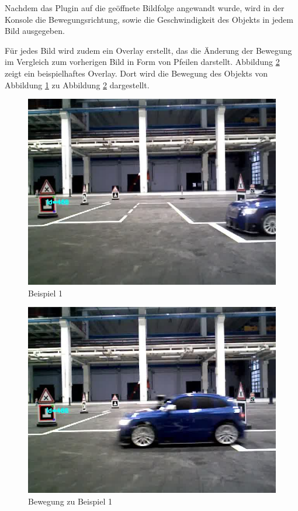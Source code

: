 Nachdem das Plugin auf die geöffnete Bildfolge angewandt wurde, wird in der Konsole die Bewegungsrichtung, sowie die Geschwindigkeit des Objekts in jedem Bild ausgegeben.

Für jedes Bild wird zudem ein Overlay erstellt, das die Änderung der Bewegung im Vergleich zum vorherigen Bild in Form von Pfeilen darstellt. Abbildung \ref{img:bsp2} zeigt ein beispielhaftes Overlay. Dort wird die Bewegung des Objekts von Abbildung \ref{img:bsp1} zu Abbildung \ref{img:bsp2} dargestellt.

\begin{figure}[p]
	\centering
	\includegraphics[scale=0.5]{./Abbildungen/bsp1.jpg}
	\caption{Beispiel 1}
	\label{img:bsp1}
\end{figure}

\begin{figure}[p]
	\centering
	\includegraphics[scale=0.5]{./Abbildungen/bsp2.jpg}
	\caption{Bewegung zu Beispiel 1}
	\label{img:bsp2}
\end{figure}


